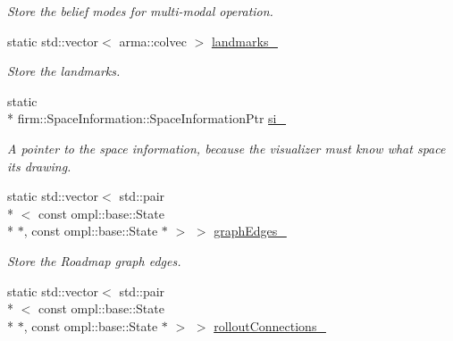 \begin{DoxyCompactItemize}
\begin{DoxyCompactList}\small\item\em Store the belief modes for multi-\/modal operation. \end{DoxyCompactList}\item 
\hypertarget{class_visualizer_a0cbfe1d4b50e562395c520fec568299d}{static std\-::vector$<$ arma\-::colvec $>$ \hyperlink{class_visualizer_a0cbfe1d4b50e562395c520fec568299d}{landmarks\-\_\-}}\label{class_visualizer_a0cbfe1d4b50e562395c520fec568299d}

\begin{DoxyCompactList}\small\item\em Store the landmarks. \end{DoxyCompactList}\item 
\hypertarget{class_visualizer_a111664b7b5b6a2c11e5bb3e3cb8fcd01}{static \\*
firm\-::\-Space\-Information\-::\-Space\-Information\-Ptr \hyperlink{class_visualizer_a111664b7b5b6a2c11e5bb3e3cb8fcd01}{si\-\_\-}}\label{class_visualizer_a111664b7b5b6a2c11e5bb3e3cb8fcd01}

\begin{DoxyCompactList}\small\item\em A pointer to the space information, because the visualizer must know what space its drawing. \end{DoxyCompactList}\item 
\hypertarget{class_visualizer_a2ff4816da3e84d1132ff0fafbdbadb98}{static std\-::vector$<$ std\-::pair\\*
$<$ const ompl\-::base\-::\-State \\*
$\ast$, const ompl\-::base\-::\-State $\ast$ $>$ $>$ \hyperlink{class_visualizer_a2ff4816da3e84d1132ff0fafbdbadb98}{graph\-Edges\-\_\-}}\label{class_visualizer_a2ff4816da3e84d1132ff0fafbdbadb98}

\begin{DoxyCompactList}\small\item\em Store the Roadmap graph edges. \end{DoxyCompactList}\item 
\hypertarget{class_visualizer_a9a3922205f833fd7a83e33a1501e0d74}{static std\-::vector$<$ std\-::pair\\*
$<$ const ompl\-::base\-::\-State \\*
$\ast$, const ompl\-::base\-::\-State $\ast$ $>$ $>$ \hyperlink{class_visualizer_a9a3922205f833fd7a83e33a1501e0d74}{rollout\-Connections\-\_\-}}\label{class_visualizer_a9a3922205f833fd7a83e33a1501e0d74}


\end{DoxyCompactItemize}
